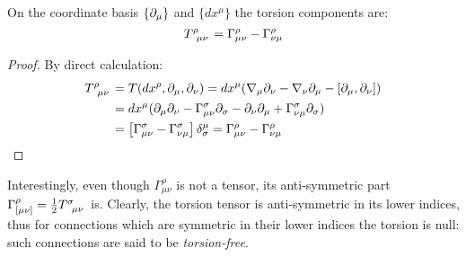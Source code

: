 \begin{proposition}
  On the coordinate basis $ \{\partial_\mu\} $ and $ \{dx^\mu\} $ the torsion components are:
  \begin{equation}
    \tensor{T}{^\rho _\mu _\nu} = \Gamma^\rho_{\mu \nu} - \Gamma^\rho_{\nu \mu}
    \label{eq:3.35}
  \end{equation}
\end{proposition}
\begin{proof}
  By direct calculation:
  \begin{equation*}
    \begin{split}
      \tensor{T}{^\rho _\mu _\nu}
      &= T(dx^\rho, \pa_\mu, \pa_\nu) = dx^\mu (\na_\mu \pa_\nu - \na_\nu \pa_\mu - [\pa_\mu, \pa_\nu]) \\
      &= dx^\mu (\pa_\mu \pa_\nu - \Gamma^\sigma_{\mu \nu} \pa_\sigma - \pa_\nu \pa_\mu + \Gamma^\sigma_{\nu \mu} \pa_\sigma) \\
      &= \left[ \Gamma^\sigma_{\mu \nu} - \Gamma^\sigma_{\nu \mu} \right] \delta^\mu_\sigma = \Gamma^\rho_{\mu \nu} - \Gamma^\rho_{\nu \mu}
    \end{split}
  \end{equation*}
\end{proof}

Interestingly, even though $ \Gamma^\rho_{\mu \nu} $ is not a tensor, its anti-symmetric part $ \Gamma^\rho_{[\mu \nu]} = \frac{1}{2} \tensor{T}{^\sigma_\mu _\nu} $ is. Clearly, the torsion tensor is anti-symmetric in its lower indices, thus for connections which are symmetric in their lower indices the torsion is null: such connections are said to be \textit{torsion-free}.

